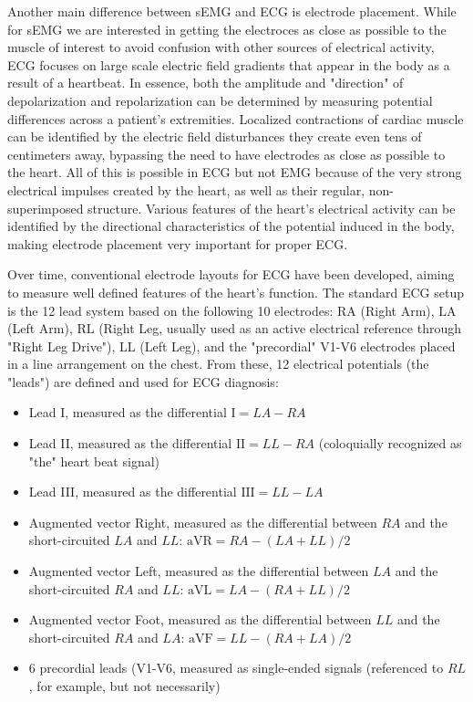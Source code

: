 \documentclass{thesis}
\begin{document}
Another main difference between sEMG and ECG is electrode placement. While for sEMG we are interested in getting the electroces as close as possible to the muscle of interest to avoid confusion with other sources of electrical activity, ECG focuses on large scale electric field gradients that appear in the body as a result of a heartbeat. In essence, both the amplitude and "direction" of depolarization and repolarization can be determined by measuring potential differences across a patient's extremities. Localized contractions of cardiac muscle can be identified by the electric field disturbances they create even tens of centimeters away, bypassing the need to have electrodes as close as possible to the heart. All of this is possible in ECG but not EMG because of the very strong electrical impulses created by the heart, as well as their regular, non-superimposed structure. Various features of the heart's electrical activity can be identified by the directional characteristics of the potential induced in the body, making electrode placement very important for proper ECG.

Over time, conventional electrode layouts for ECG have been developed, aiming to measure well defined features of the heart's function. The standard ECG setup is the 12 lead system based on the following 10 electrodes: RA (Right Arm), LA (Left Arm), RL (Right Leg, usually used as an active electrical reference through "Right Leg Drive"), LL (Left Leg), and the "precordial" V1-V6 electrodes placed in a line arrangement on the chest. From these, 12 electrical potentials (the "leads") are defined and used for ECG diagnosis:\cite{Meek2002}
\begin{itemize}
    \item Lead I, measured as the differential $\text{I} = LA - RA$
    \item Lead II, measured as the differential $\text{II} = LL - RA$ (coloquially recognized as "the" heart beat signal)
    \item Lead III, measured as the differential $\text{III} = LL - LA$
    \item Augmented vector Right, measured as the differential between $RA$ and the short-circuited $LA$ and $LL$: $\text{aVR} = RA - (LA+LL)/2$
    \item Augmented vector Left, measured as the differential between $LA$ and the short-circuited $RA$ and $LL$: $\text{aVL} = LA - (RA+LL)/2$
    \item Augmented vector Foot, measured as the differential between $LL$ and the short-circuited $RA$ and $LA$: $\text{aVF} = LL - (RA+LA)/2$ 
    \item 6 precordial leads (V1-V6, measured as single-ended signals (referenced to $RL$, for example, but not necessarily)
\end{itemize}
\end{document}
